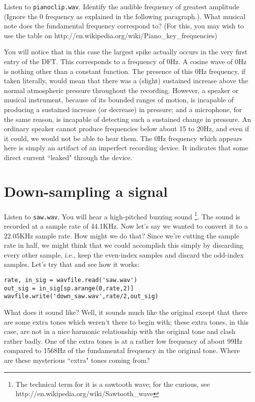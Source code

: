 \begin{problem}
Listen to \texttt{pianoclip.wav}. Identify the audible frequency of greatest amplitude (Ignore the 0 frequency as explained in the following paragraph.).  What musical note does the fundamental frequency correspond to? (For this, you may wish to use the table on http://en.wikipedia.org/wiki/Piano\_key\_frequencies)
\end{problem}

You will notice that in this case the largest spike actually occurs in the very first entry of the DFT. This corresponds to a frequency of 0Hz. A cosine wave of 0Hz is nothing other than a constant function. The presence of this 0Hz frequency, if taken literally, would mean that there was a (slight) sustained increase above the normal atmospheric pressure throughout the recording. However, a speaker or musical instrument, because of its bounded ranges of motion, is incapable of producing a sustained increase (or decrease) in pressure; and a microphone, for the same reason, is incapable of detecting such a sustained change in pressure. An ordinary speaker cannot produce frequencies below about 15 to 20Hz, and even if it could, we would not be able to hear them. The 0Hz frequency which appears here is simply an artifact of an imperfect recording device. It indicates that some direct current ``leaked" through the device.



\section*{Down-sampling a signal}

Listen to \texttt{saw.wav}. You will hear a high-pitched buzzing sound \footnote{The technical term for it is a sawtooth wave; for the curious, see http://en.wikipedia.org/wiki/Sawtooth\_wave}. The sound is recorded at a sample rate of 44.1KHz. Now let's say we wanted to convert it to a 22.05KHz sample rate. How might we do that? Since we're cutting the sample rate in half, we might think that we could accomplish this simply by discarding every other sample, i.e., keep the even-index samples and discard the odd-index samples. Let's try that and see how it works:
\begin{lstlisting}
rate, in_sig = wavfile.read('saw.wav')
out_sig = in_sig[sp.arange(0,rate,2)]
wavfile.write('down_saw.wav',rate/2,out_sig)
\end{lstlisting}
What does it sound like? Well, it sounds much like the original except that there are some extra tones which weren't there to begin with; these extra tones, in this case, are not in a nice harmonic relationship with the original tone and clash rather badly. One of the extra tones is at a rather low frequency of about 99Hz compared to 1568Hz of the fundamental frequency in the original tone. Where are these mysterious ``extra" tones coming from?

